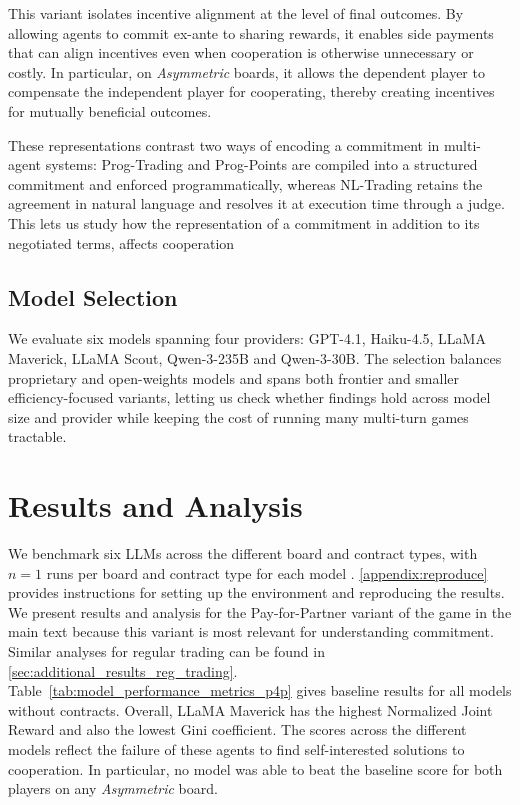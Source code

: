 \documentclass{article} %
\newcommand{\PTC}{Prog-Trading\xspace}
\newcommand{\NLTC}{NL-Trading\xspace}
\newcommand{\PPC}{Prog-Points\xspace}
\newcommand{\GPT}{GPT-4.1\xspace}
\newcommand{\Haiku}{Haiku-4.5\xspace}
\newcommand{\Maverick}{LLaMA Maverick\xspace}
\newcommand{\Scout}{LLaMA Scout\xspace}
\newcommand{\Qttf}{Qwen-3-235B\xspace}
\newcommand{\Qthirty}{Qwen-3-30B\xspace}
\newcommand{\PforP}{Pay-for-Partner\xspace}
\begin{document}
This variant isolates incentive alignment at the level of final outcomes. By allowing agents to commit ex-ante to sharing rewards, it enables side payments that can align incentives even when cooperation is otherwise unnecessary or costly. In particular, on \textit{Asymmetric} boards, it allows the dependent player to compensate the independent player for cooperating, thereby creating incentives for mutually beneficial outcomes.

These representations contrast two ways of encoding a commitment in multi-agent systems: \PTC and \PPC are compiled into a structured commitment \citep{singh1999ontology} and enforced programmatically, whereas \NLTC retains the agreement in natural language and resolves it at execution time through a judge. This lets us study how the representation of a commitment in addition to its negotiated terms, affects cooperation

\subsection{Model Selection}
We evaluate six models spanning four providers: \GPT, \Haiku, \Maverick, \Scout, \Qttf and \Qthirty. The selection balances proprietary and open-weights models and spans both frontier and smaller efficiency-focused variants, letting us check whether findings hold across model size and provider while keeping the cost of running many multi-turn games tractable.



\section{Results and Analysis}
\label{sec:results}

%
We benchmark six LLMs across the different board and contract types, with $n=1$ runs per board and contract type for each model \footnotemark.  \cref{appendix:reproduce} provides instructions for setting up the environment and reproducing the results. We present results and analysis for the \PforP variant of the game in the main text because this variant is most relevant for understanding commitment. Similar analyses for regular trading can be found in \cref{sec:additional_results_reg_trading}. Table~\ref{tab:model_performance_metrics_p4p} gives baseline results for all models without contracts. Overall, \Maverick
has the highest Normalized Joint Reward and also the lowest Gini coefficient. The scores across the different models reflect the failure of these agents to find self-interested solutions to cooperation. In particular, no model was able to beat the baseline score for both players on any \textit{Asymmetric} board. 
\end{document}
